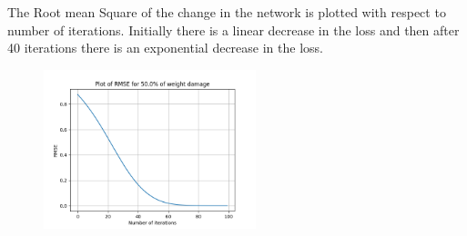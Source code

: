 \documentclass{article}
\begin{document}
\begin{figure}[H]
\hspace{0.001\textwidth}
\end{figure}


The Root mean Square of the change in the network is plotted with respect to number of iterations. Initially there is a linear decrease in the loss and then after 40 iterations there is an exponential decrease in the loss.
\begin{figure}[H]
\includegraphics[width=0.55\textwidth]{Mona_33.png}
\centering
\end{figure}
\end{document}
